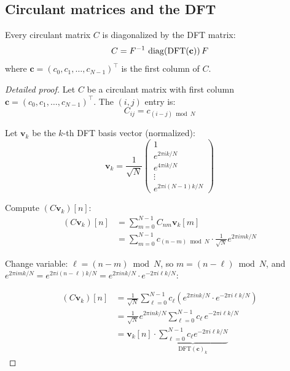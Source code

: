 \begin{notechapter}
\subsection{Circulant matrices and the DFT}

\begin{theorem}
\label{dft-to-gnn:thm:circulant-eigenvectors}
Every circulant matrix $C$ is diagonalized by the DFT matrix:
\begin{equation}
C = F^{-1} \, \operatorname{diag}(\text{DFT}(\mathbf{c})) \, F
\end{equation}
where $\mathbf{c} = (c_0, c_1, \ldots, c_{N-1})^\top$ is the first column
of $C$.
\end{theorem}

\begin{proof}[Detailed proof]
Let $C$ be a circulant matrix with first column $\mathbf{c} =
(c_0, c_1, \ldots, c_{N-1})^\top$. The $(i,j)$ entry is:
\[
C_{ij} = c_{(i-j) \bmod N}
\]

Let $\mathbf{v}_k$ be the $k$-th DFT basis vector (normalized):
\[
\mathbf{v}_k = \frac{1}{\sqrt{N}}
\begin{pmatrix}
1 \\ e^{2\pi i k/N} \\ e^{4\pi i k/N} \\ \vdots \\ e^{2\pi i (N-1)k/N}
\end{pmatrix}
\]

Compute $(C\mathbf{v}_k)[n]$:
\begin{align*}
(C\mathbf{v}_k)[n]
    &= \sum_{m=0}^{N-1} C_{nm} \mathbf{v}_k[m] \\
    &= \sum_{m=0}^{N-1} c_{(n-m) \bmod N} \cdot \frac{1}{\sqrt{N}}
       e^{2\pi i mk/N}
\end{align*}

Change variable: $\ell = (n-m) \bmod N$, so $m = (n-\ell) \bmod N$, and
$e^{2\pi i mk/N} = e^{2\pi i (n-\ell)k/N} = e^{2\pi i nk/N}
\cdot e^{-2\pi i \ell k/N}$:

\begin{align*}
(C\mathbf{v}_k)[n]
    &= \frac{1}{\sqrt{N}} \sum_{\ell=0}^{N-1} c_\ell
       \left( e^{2\pi i nk/N} \cdot e^{-2\pi i \ell k/N} \right) \\
    &= \frac{1}{\sqrt{N}} e^{2\pi i nk/N}
       \sum_{\ell=0}^{N-1} c_\ell \, e^{-2\pi i \ell k/N} \\
    &= \mathbf{v}_k[n] \cdot \underbrace{\sum_{\ell=0}^{N-1} c_\ell
       e^{-2\pi i \ell k/N}}_{\text{DFT}(\mathbf{c})_k}
\end{align*}


\end{proof}
\end{notechapter}
